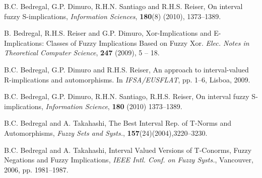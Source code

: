 \documentclass[12pt]{article}
\theoremstyle{plain}
\theoremstyle{remark}
\theoremstyle{definition}
\theoremstyle{proposition}
\begin{document}
\begin{thebibliography}{8}
{%

B.C. Bedregal, G.P. Dimuro, R.H.N. Santiago and R.H.S. Reiser, On
interval fuzzy {S}-implications, \emph{Information Sciences},
\textbf{180}(8) (2010), 1373--1389.

 B. Bedregal, R.H.S. Reiser and G.P. Dimuro,
Xor-Implications and E-Implications: Classes of Fuzzy Implications
Based on Fuzzy Xor. \emph{Elec. Notes in Theoretical Computer
Science}, {\bf 247} (2009), 5 -- 18.


 B.C. Bedregal, G.P. Dimuro and R.H.S. Reiser, An
approach to interval-valued R-implications and automorphisms. In
\emph{IFSA/EUSFLAT}, pp. 1--6, Lisboa, 2009.

B.C. Bedregal, G.P. Dimuro, R.H.N. Santiago, R.H.S. Reiser, On
interval fuzzy {S}-implications, \emph{Information Science},
\textbf{180} (2010) 1373--1389.

 B.C. Bedregal and A. Takahashi,
The Best Interval Rep. of T-Norms and Automorphisms,
{\it Fuzzy Sets and Systs.}, \textbf{157}(24)(2004),3220--3230.

 B.C. Bedregal and A. Takahashi,
Interval Valued Versions of T-Conorms, Fuzzy Negations and Fuzzy
Implications, \emph{IEEE Intl. Conf. on Fuzzy Systs.}, Vancouver,
2006, pp. 1981--1987.




}
\end{thebibliography}
\end{document}
